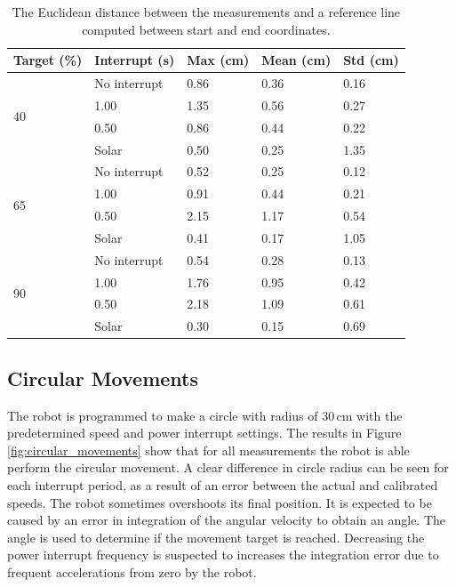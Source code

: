\begin{table}[t]
	\centering
	\caption{The Euclidean distance between the measurements and a reference line computed between start and end coordinates.}
	\label{tab:straight_results}
	\begin{tabular}{|l|l||l|l|l|}
		\hline
		Target (\%) & Interrupt (s) & Max (cm) & Mean (cm) & Std (cm)\\
		\hline \hline
		\multirow{4}{*}{40} & No interrupt & 0.86 & 0.36 & 0.16 \\
		& 1.00 & 1.35 & 0.56 & 0.27 \\
		& 0.50 & 0.86 & 0.44 & 0.22 \\
		& Solar & 0.50 & 0.25 & 1.35 \\
		\hline
		\multirow{4}{*}{65} & No interrupt & 0.52 & 0.25 & 0.12 \\
		& 1.00 & 0.91 & 0.44 & 0.21 \\
		& 0.50 & 2.15 & 1.17 & 0.54 \\
		& Solar & 0.41 & 0.17 & 1.05 \\
		\hline
		\multirow{4}{*}{90} & No interrupt & 0.54 & 0.28 & 0.13 \\
		& 1.00 & 1.76 & 0.95 & 0.42 \\
		& 0.50 & 2.18 & 1.09 & 0.61 \\
		& Solar & 0.30 & 0.15 & 0.69 \\
		\hline
	\end{tabular}
\end{table}

\subsection{Circular Movements}

The robot is programmed to make a circle with radius of 30\,cm with the predetermined speed and power interrupt settings.
The results in Figure \ref{fig:circular_movements} show that for all measurements the robot is able perform the circular movement.
A clear difference in circle radius can be seen for each interrupt period, as a result of an error between the actual and calibrated speeds.
The robot sometimes overshoots its final position.
It is expected to be caused by an error in integration of the angular velocity to obtain an angle.
The angle is used to determine if the movement target is reached.
Decreasing the power interrupt frequency is suspected to increases the integration error due to frequent accelerations from zero by the robot.


